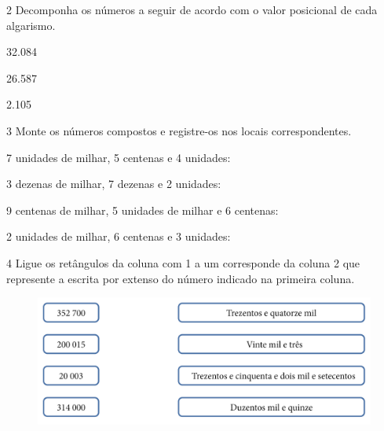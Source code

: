 \pagebreak
\num{2} Decomponha os números a seguir de acordo com o valor posicional de
cada algarismo.

\begin{escolha}
\item 32.084\\

\item 26.587\\

\item 2.105\\
\end{escolha}


\num{3} Monte os números compostos e registre-os nos locais correspondentes.

\begin{escolha}
\item 7 unidades de milhar, 5 centenas e 4 unidades: 

\item 3 dezenas de milhar, 7 dezenas e 2 unidades: 

\item 9 centenas de milhar, 5 unidades de milhar e 6 centenas: 

\item 2 unidades de milhar, 6 centenas e 3 unidades: 
\end{escolha}


\pagebreak
\num{4} Ligue os retângulos da coluna com 1 a um corresponde da coluna 2
que represente a escrita por extenso do número indicado na primeira
coluna.

\begin{figure}[htpb!]
\includegraphics[width=\textwidth]{../ilustracoes/MAT5/SAEB_5ANO_MAT_figura3.png}
\end{figure}

